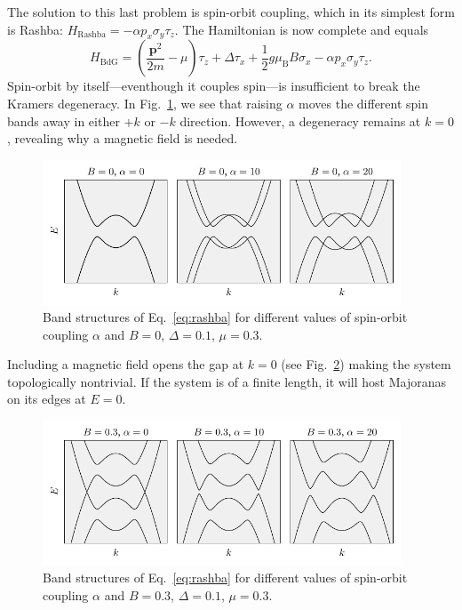 The solution to this last problem is spin-orbit coupling, which in its simplest form is Rashba: $H_{\textrm{Rashba}}=-\alpha p_{x}\sigma_{y}\tau_{z}$.
The Hamiltonian is now complete and equals
\begin{equation}
H_{\textrm{BdG}}=\left(\frac{\bm{p}^{2}}{2m}-\mu\right)\tau_{z}+\Delta\tau_{x}+\frac{1}{2}g\mu_{\textrm{B}}B\sigma_{x}-\alpha p_{x}\sigma_{y}\tau_{z}.\label{eq:rashba}
\end{equation}
Spin-orbit by itself---eventhough it couples spin---is insufficient to break the Kramers degeneracy.
In Fig.~\ref{fig:SO_no_zeeman}, we see that raising $\alpha$ moves the different spin bands away in either $+k$ or $-k$ direction.
However, a degeneracy remains at $k=0$, revealing why a magnetic field is needed.
\begin{figure}
\begin{center}
\includegraphics[width=0.95\textwidth]{chapter_introduction/figures/SO_no_zeeman.pdf}
\caption{Band structures of Eq.~\eqref{eq:rashba} for different values of spin-orbit coupling $\alpha$ and $B=0$, $\Delta=0.1$, $\mu=0.3$.
\label{fig:SO_no_zeeman}}
\end{center}
\end{figure}
Including a magnetic field opens the gap at $k=0$ (see Fig.~\ref{fig:SO_and_zeeman}) making the system topologically nontrivial.
If the system is of a finite length, it will host Majoranas on its edges at $E=0$.
\begin{figure}
\begin{center}
\includegraphics[width=0.95\textwidth]{chapter_introduction/figures/SO_and_zeeman.pdf}
\caption{Band structures of Eq.~\eqref{eq:rashba} for different values of spin-orbit coupling $\alpha$ and $B=0.3$, $\Delta=0.1$, $\mu=0.3$.
\label{fig:SO_and_zeeman}}
\end{center}
\end{figure}

